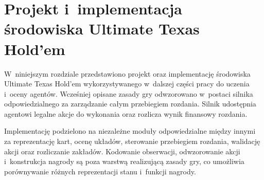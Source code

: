 \chapter{Projekt i~implementacja środowiska Ultimate Texas Hold’em}
\label{chap:srodowisko-uth}

W~niniejszym rozdziale przedstawiono projekt oraz implementację środowiska
Ultimate Texas Hold’em wykorzystywanego w~dalszej części pracy do uczenia
i~oceny agentów. Wcześniej opisane zasady gry odwzorowano w~postaci silnika
odpowiedzialnego za zarządzanie całym przebiegiem rozdania. Silnik
udostępnia agentowi legalne akcje do wykonania oraz rozlicza wynik
finansowy rozdania.

Implementację podzielono na niezależne moduły odpowiedzialne między innymi
za reprezentację kart, ocenę układów, sterowanie przebiegiem rozdania,
walidację akcji oraz rozliczanie zakładów. Kodowanie obserwacji, odwzorowanie akcji
i~konstrukcja nagrody są poza warstwą realizującą zasady
gry, co umożliwia porównywanie różnych reprezentacji stanu i~funkcji nagrody.







